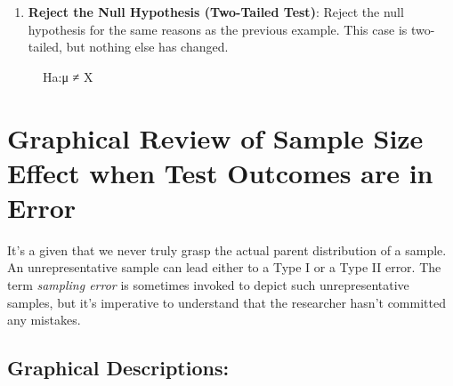 \documentclass[
  letterpaper,
  DIV=11,
  numbers=noendperiod]{scrreprt}
\providecommand{\tightlist}{%
  \setlength{\itemsep}{0pt}\setlength{\parskip}{0pt}}\usepackage{longtable,booktabs,array}
\begin{document}
\begin{enumerate}
\def\labelenumi{\arabic{enumi}.}
\setcounter{enumi}{3}
\tightlist
\item
  \textbf{Reject the Null Hypothesis (Two-Tailed Test)}: Reject the null
  hypothesis for the same reasons as the previous example. This case is
  two-tailed, but nothing else has changed.
\end{enumerate}

\begin{figure}


\caption{\label{fig-5-5.reject_2_two_tailed}Ha:μ ≠ X}

\end{figure}%

\section{Graphical Review of Sample Size Effect when Test Outcomes are
in
Error}\label{graphical-review-of-sample-size-effect-when-test-outcomes-are-in-error}

It's a given that we never truly grasp the actual parent distribution of
a sample. An unrepresentative sample can lead either to a Type I or a
Type II error. The term \emph{sampling error} is sometimes invoked to
depict such unrepresentative samples, but it's imperative to understand
that the researcher hasn't committed any mistakes.

\subsection{Graphical Descriptions:}\label{graphical-descriptions-1}
\end{document}
